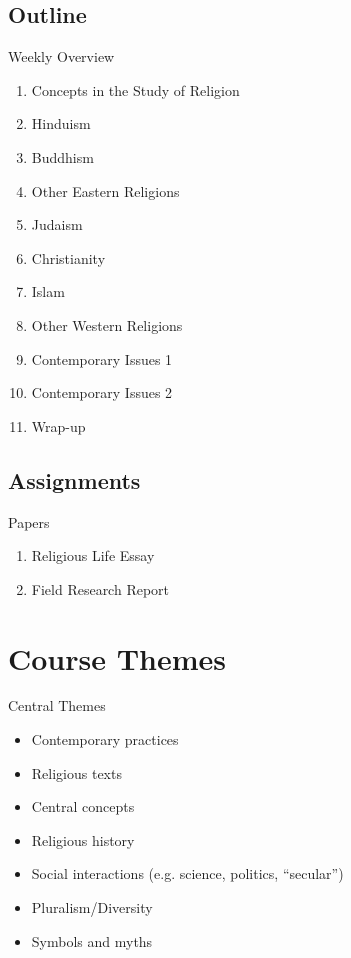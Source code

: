 

\subsection{Outline}
\begin{frame}{Weekly Overview}
	\begin{enumerate}
		\item<1->Concepts in the Study of Religion	%
		\item<2->Hinduism							%
		\item<3->Buddhism 							%
		\item<4->Other Eastern Religions			%
		\item<5->Judaism							%
		\item<6->Christianity						%
		\item<7->Islam								%
		\item<8->Other Western Religions			%
		\item<9->Contemporary Issues 1				%
		\item<10->Contemporary Issues 2				%
		\item<11->Wrap-up							%
	\end{enumerate}
\end{frame}

\subsection{Assignments}
\begin{frame}{Papers}
	\begin{enumerate}
		\item<1->Religious Life Essay
		\item<2->Field Research Report
	\end{enumerate}
\end{frame}

\section{Course Themes}
\begin{frame}{Central Themes}
	\begin{itemize}
		\item<1->Contemporary practices
		\item<2->Religious texts
		\item<3->Central concepts
		\item<4->Religious history
		\item<5->Social interactions (e.g. science, politics, ``secular'')
		\item<6->Pluralism/Diversity
		\item<7->Symbols and myths
	\end{itemize}
\end{frame}

\timeout
